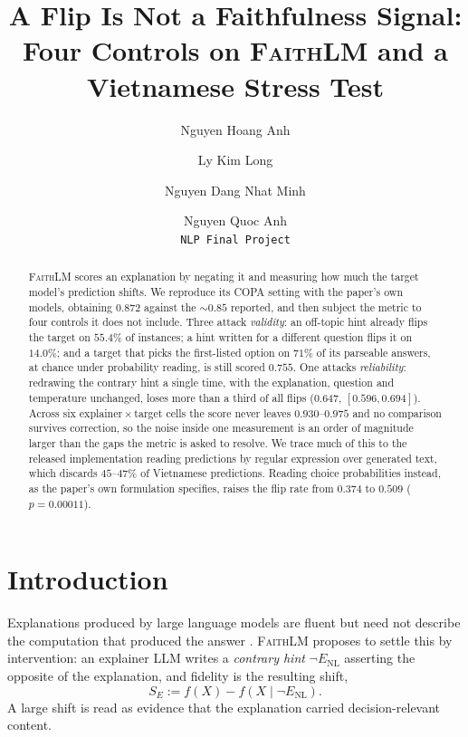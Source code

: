 \documentclass[11pt]{article}
\title{A Flip Is Not a Faithfulness Signal:\\
Four Controls on \textsc{FaithLM} and a Vietnamese Stress Test}
\author{
  Nguyen Hoang Anh \and Ly Kim Long \and Nguyen Dang Nhat Minh \and Nguyen Quoc Anh \\
  \texttt{NLP Final Project} \\
}
\begin{document}
\maketitle

\begin{abstract}
\textsc{FaithLM} scores an explanation by negating it and measuring how much the
target model's prediction shifts. We reproduce its COPA setting with the paper's
own models, obtaining $0.872$ against the $\sim\!0.85$ reported, and then subject
the metric to four controls it does not include. Three attack \emph{validity}: an
off-topic hint already flips the target on $55.4\%$ of instances; a hint written
for a different question flips it on $14.0\%$; and a target that picks the
first-listed option on $71\%$ of its parseable answers, at chance under
probability reading, is still scored $0.755$. One attacks \emph{reliability}:
redrawing the contrary hint a single time, with the explanation, question and
temperature unchanged, loses more than a third of all flips ($0.647$,
$[0.596, 0.694]$). Across six explainer\,$\times$\,target cells the score never
leaves $0.930$--$0.975$ and no comparison survives correction, so the noise
inside one measurement is an order of magnitude larger than the gaps the metric
is asked to resolve. We trace much of this to the released implementation
reading predictions by regular expression over generated text, which discards
$45$--$47\%$ of Vietnamese predictions. Reading choice probabilities instead, as
the paper's own formulation specifies, raises the flip rate from $0.374$ to
$0.509$ ($p=0.00011$).
\end{abstract}

\section{Introduction}

Explanations produced by large language models are fluent but need not describe
the computation that produced the answer
\citep{jacovi2020faithfully,turpin2023unfaithful}. \textsc{FaithLM}
\citep{chuang2026faithlm} proposes to settle this by intervention: an explainer
LLM writes a \emph{contrary hint} $\neg E_{\text{NL}}$ asserting the opposite of
the explanation, and fidelity is the resulting shift,
\begin{equation}
  S_E := f(X) - f(X \mid \neg E_{\text{NL}}).
  \label{eq:se}
\end{equation}
A large shift is read as evidence that the explanation carried decision-relevant
content.
\end{document}
